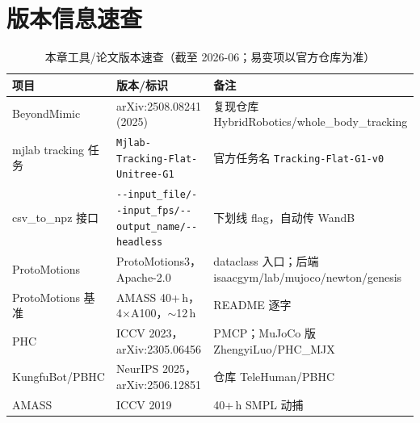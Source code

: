 \section*{版本信息速查}
\label{sec:rlmc-mi-versions}

\begin{table}[H]
\centering
\small
\caption{本章工具/论文版本速查（截至 2026-06；易变项以官方仓库为准）}
\label{tab:rlmc-mi-ver}
\begin{tabular}{@{}lll@{}}
\toprule
项目 & 版本/标识 & 备注 \\
\midrule
BeyondMimic & arXiv:2508.08241 (2025) & 复现仓库 HybridRobotics/whole\_body\_tracking \\
mjlab tracking 任务 & \verb|Mjlab-Tracking-Flat-Unitree-G1| & 官方任务名 \verb|Tracking-Flat-G1-v0| \\
csv\_to\_npz 接口 & \verb|--input_file/--input_fps/--output_name/--headless| & 下划线 flag，自动传 WandB \\
ProtoMotions & ProtoMotions3，Apache-2.0 & dataclass 入口；后端 isaacgym/lab/mujoco/newton/genesis \\
ProtoMotions 基准 & AMASS 40+\,h，4$\times$A100，$\sim$12\,h & README 逐字 \\
PHC & ICCV 2023，arXiv:2305.06456 & PMCP；MuJoCo 版 ZhengyiLuo/PHC\_MJX \\
KungfuBot/PBHC & NeurIPS 2025，arXiv:2506.12851 & 仓库 TeleHuman/PBHC \\
AMASS & ICCV 2019 & 40+\,h SMPL 动捕 \\
\bottomrule
\end{tabular}
\end{table}
